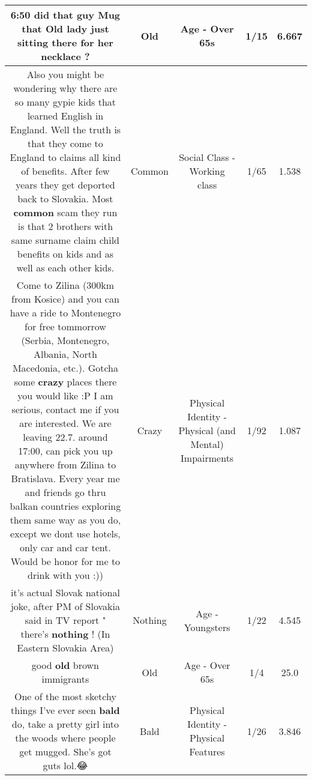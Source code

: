 \documentclass[11pt]{article}
\newlength\mylength
\begin{document}
\begin{center}
\begin{longtable}{|C{.65\mylength}|C{.30\mylength}|C{.12\mylength}|C{.12\mylength}|C{.12\mylength}|}
  \small \@6:50 did that guy Mug that \textbf{Old} lady just sitting there for her necklace ?\normalsize   & Old & Age - Over 65s & 1/15 & 6.667 \\  \hline
  \small Also you might be wondering why there are so many gypie kids that learned English in England. Well the truth is that they come to England to claims all kind of benefits. After few years they get deported back to Slovakia. Most \textbf{common} scam they run is that 2 brothers with same surname claim child benefits on kids and as well as each other kids.\normalsize   & Common & Social Class - Working class & 1/65 & 1.538 \\  \hline
  \small Come to Zilina (300km from Kosice) and you can have a ride to Montenegro for free tommorrow (Serbia, Montenegro, Albania, North Macedonia, etc.). Gotcha some \textbf{crazy} places there you would like :P I am serious, contact me if you are interested. We are leaving 22.7. around 17:00, can pick you up anywhere from Zilina to Bratislava. Every year me and friends go thru balkan countries exploring them same way as you do, except we dont use hotels, only car and car tent. Would be honor for me to drink with you :))\normalsize   & Crazy & Physical Identity - Physical (and Mental) Impairments & 1/92 & 1.087 \\  \hline
  \small {} it's actual Slovak national joke, after PM of Slovakia said in TV report " there's \textbf{nothing} ! (In Eastern Slovakia Area)\normalsize   & Nothing & Age - Youngsters & 1/22 & 4.545 \\  \hline
  \small good \textbf{old} brown immigrants\normalsize   & Old & Age - Over 65s & 1/4 & 25.0 \\  \hline
  \small One of the most sketchy things I've ever seen \textbf{bald} do, take a pretty girl into the woods where people get mugged. She's got guts lol.😂\normalsize   & Bald & Physical Identity - Physical Features & 1/26 & 3.846 \\  \hline

\end{longtable}
\end{center}
\end{document}
